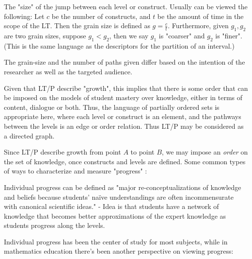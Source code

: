 \documentclass{TC}
\begin{document}
\begin{mdframed}
\begin{definition}
The "size" of the jump between each level or construct. Usually can be viewed the following: Let $c$ be the number of constructs, and $t$ be the amount of time in the scope of the LT. Then the grain size is defined as $g = \displaystyle \frac{c}{t}$. Furthermore, given $g_1 , g_2$ are two grain sizes, suppose $g_1 < g_2$, then we say $g_1$ is "coarser" and $g_2$ is "finer". (This is the same language as the descriptors for the partition of an interval.)
\end{definition}
\end{mdframed}
 \begin{remark}The grain-size and the number of paths given differ based on the intention of the researcher as well as the targeted audience.  \end{remark}

Given that LT/P describe "growth", this implies that there is some order that can be imposed on the models of student mastery over knowledge, either in terms of content, dialogue or both. Thus, the language of partially ordered sets is appropriate here, where each level or construct is an element, and the pathways between the levels is an edge or order relation. Thus LT/P may be considered as a directed graph. 

Since LT/P describe growth from point $A$ to point $B$, we may impose an \emph{order} on the set of knowledge, once constructs and levels are defined. Some common types of ways to characterize and measure "progress" \parencite{duncan_learning_2018}: 
\begin{mdframed}
\begin{definition}
Individual progress can be defined as "major re-conceptualizations of knowledge and beliefs because students' na\"ive understandings are often incommensurate with canonical scientific ideas." - Idea is that students have a network of knowledge that becomes better approximations of the expert knowledge as students progress along the levels.
\end{definition}
\end{mdframed}

Individual progress has been the center of study for most subjects, while in mathematics education there's been another perspective on viewing progress:
\end{document}
